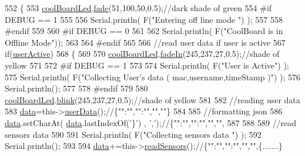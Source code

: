 \begin{DoxyCode}
552 \{
553     \hyperlink{class_cool_board_a1b1d3c684a5baa56b08486e192fd8e97}{coolBoardLed}.\hyperlink{class_cool_board_led_af1cacbaa88db8bcf6042c1083ba41155}{fade}(51,100,50,0.5);\textcolor{comment}{//dark shade of green  }
554 \textcolor{preprocessor}{#if DEBUG == 1  }
555     
556     Serial.println( F(\textcolor{stringliteral}{"Entering off line mode "}) ); 
557     
558 \textcolor{preprocessor}{#endif}
559 
560 \textcolor{preprocessor}{#if DEBUG == 0}
561 
562     Serial.println( F(\textcolor{stringliteral}{"CoolBoard is in Offline Mode"}));
563 
564 \textcolor{preprocessor}{#endif}
565 
566     \textcolor{comment}{//read user data if user is active}
567     \textcolor{keywordflow}{if}(\hyperlink{class_cool_board_a6395459131d6889a3005f79c7a35e964}{userActive})
568     \{
569 
570         \hyperlink{class_cool_board_a1b1d3c684a5baa56b08486e192fd8e97}{coolBoardLed}.\hyperlink{class_cool_board_led_ab778f5e7bed0ab74e3906d82110493c3}{fadeIn}(245,237,27,0.5);\textcolor{comment}{//shade of yellow}
571 
572 \textcolor{preprocessor}{    #if DEBUG == 1}
573         
574         Serial.println( F(\textcolor{stringliteral}{"User is Active"}) );
575         Serial.println( F(\textcolor{stringliteral}{"Collecting User's data ( mac,username,timeStamp )"}) );
576         Serial.println();
577 
578 \textcolor{preprocessor}{    #endif}
579 
580         \hyperlink{class_cool_board_a1b1d3c684a5baa56b08486e192fd8e97}{coolBoardLed}.\hyperlink{class_cool_board_led_a96e1ea13003eee34c9dbcef340404426}{blink}(245,237,27,0.5);\textcolor{comment}{//shade of yellow   }
581 
582         \textcolor{comment}{//reading user data}
583         \hyperlink{class_cool_board_a427fb753dd8575bdf821c70a5c63d695}{data}=this->\hyperlink{class_cool_board_ae7358fb6e623cfc81b775f5f1734909b}{userData}();\textcolor{comment}{//\{"":"","":"","",""\}}
584 
585         \textcolor{comment}{//formatting json }
586         \hyperlink{class_cool_board_a427fb753dd8575bdf821c70a5c63d695}{data}.setCharAt( \hyperlink{class_cool_board_a427fb753dd8575bdf821c70a5c63d695}{data}.lastIndexOf(\textcolor{charliteral}{'\}'}) , \textcolor{charliteral}{','});\textcolor{comment}{//\{"":"","":"","","",}
587         
588                 
589         \textcolor{comment}{//read sensors data}
590 
591         Serial.println( F(\textcolor{stringliteral}{"Collecting sensors data "}) );
592         Serial.println();
593 
594         \hyperlink{class_cool_board_a427fb753dd8575bdf821c70a5c63d695}{data}+=this->\hyperlink{class_cool_board_ad03abdce2e65f520bbf2cff0f2d083cf}{readSensors}();\textcolor{comment}{//\{"":"","":"","","",\{.......\}}

\end{DoxyCode}
